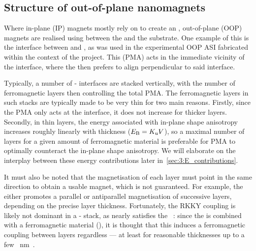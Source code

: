 \subsection{Structure of out-of-plane nanomagnets}\label{sec:3:OOP_nanomagnet_PMA} %
Where in-plane (IP) magnets mostly rely on  to create an , out-of-plane (OOP) magnets are realised using  between the  and the substrate.
One example of this is the interface between  and , as was used in the experimental OOP ASI fabricated within the context of the \spinengine project.
This  (PMA) acts in the immediate vicinity of the interface, where the  then prefers to align perpendicular to said interface. \par
Typically, a number of - interfaces are stacked vertically, with the number of ferromagnetic  layers then controlling the total PMA.
The ferromagnetic layers in such stacks are typically made to be very thin for two main reasons.
Firstly, since the PMA only acts at the interface, it does not increase for thicker layers.
Secondly, in thin layers, the energy associated with in-plane shape anisotropy increases roughly linearly with thickness ($E_\mathrm{B}=K_\mathrm{u}V$), so a maximal number of layers for a given amount of ferromagnetic material is preferable for PMA to optimally counteract the in-plane shape anisotropy.
We will elaborate on the interplay between these energy contributions later in~\cref{sec:3:E_contributions}. \par
It must also be noted that the magnetisation of each  layer must point in the same direction to obtain a usable magnet, which is not guaranteed.
For example, the ~\cite{RKKY_RK,RKKY_K,RKKY_Y} either promotes a parallel or antiparallel magnetisation of successive  layers, depending on the precise  layer thickness.
Fortunately, the RKKY coupling is likely not dominant in a - stack, as  nearly satisfies the ~\cite{PtMagneticOrder}: since the  is combined with a ferromagnetic material (), it is thought that this induces a ferromagnetic coupling between  layers regardless --- at least for reasonable  thicknesses up to a few \SI{}{\nano\metre}~\cite{PerpendicularMagnetizationASI}.


